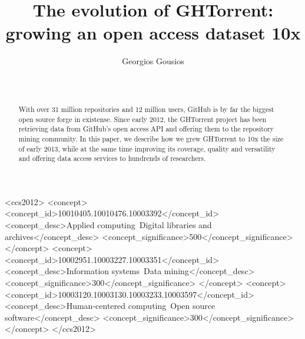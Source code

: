 \documentclass{sig-alternate}
\begin{document}






%

\title{The evolution of GHTorrent: growing an open access dataset 10x}
%
\author{
%
\alignauthor Georgios Gousios\\
       \\
       \\
}

\maketitle
\begin{abstract}

With over 31 million repositories and 12 million users, GitHub is by far the
biggest open source forge in existense. Since early 2012, the GHTorrent project
has been retrieving data from GitHub's open access API and offering them to the
repository mining community.  In this paper, we describe how we grew GHTorrent
to 10x the size of early 2013, while at the same time improving its coverage,
quality and versatility and offering data access services to hundrends of
researchers.

\end{abstract}

%
%
\begin{CCSXML}
<ccs2012>
<concept>
<concept_id>10010405.10010476.10003392</concept_id>
<concept_desc>Applied computing~Digital libraries and archives</concept_desc>
<concept_significance>500</concept_significance>
</concept>
<concept>
<concept_id>10002951.10003227.10003351</concept_id>
<concept_desc>Information systems~Data mining</concept_desc>
<concept_significance>300</concept_significance>
</concept>
<concept>
<concept_id>10003120.10003130.10003233.10003597</concept_id>
<concept_desc>Human-centered computing~Open source software</concept_desc>
<concept_significance>300</concept_significance>
</concept>
</ccs2012>
\end{CCSXML}
\end{document}
